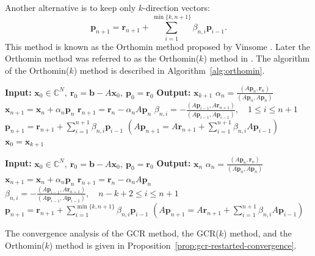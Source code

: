 {Another alternative is to keep only $k$-direction vectors:}
\[\bm p_{n+1}=\bm r_{n+1}+\sum_{i=1}^{\min\{k,n+1\}}\beta_{n,i}\bm p_{i-1}.\]
{This method is known as the Orthomin method proposed by Vinsome . Later the Orthomin method was referred to as the Orthomin($k$) method in . The algorithm of the Orthomin($k$) method is described in Algorithm\ \ref{alg:orthomin}.}
\begin{algorithm}[H]\caption{{The GCR($k$) method}}\label{alg:gcr-restarted}\begin{algorithmic}[1]
\Statex\textbf{Input:} $\bm x_0\in\mathbb C^N,\ \bm r_0=\bm b-A\bm x_0,\ \bm p_0=\bm r_0$
\Statex\textbf{Output:} $\bm x_{k+1}$
\State $\alpha_n=\frac{(A\bm p_n,\bm r_n)}{(A\bm p_n,A\bm p_n)}$
\State $\bm x_{n+1}=\bm x_n+\alpha_n\bm p_n$
\State $\bm r_{n+1}=\bm r_n-\alpha_nA\bm p_n$
\State $\beta_{n,i}=-\frac{(A\bm p_{i-1},A\bm r_{n+1})}{(A\bm p_{i-1},A\bm p_{i-1})},\quad1\le i\le n+1$
\State $\bm p_{n+1}=\bm r_{n+1}+\sum_{i=1}^{n+1}\beta_{n,i}\bm p_{i-1}$
\State $(A\bm p_{n+1}=A\bm r_{n+1}+\sum_{i=1}^{n+1}\beta_{n,i}A\bm p_{i-1})$
\EndFor\State $\bm x_0=\bm x_{k+1}$
\end{algorithmic}\end{algorithm}
\begin{algorithm}[H]\caption{{The Orthomin($k$) method}}\label{alg:orthomin}\begin{algorithmic}[1]
\Statex\textbf{Input:} $\bm x_0\in\mathbb C^N,\ \bm r_0=\bm b-A\bm x_0,\ \bm p_0=\bm r_0$
\Statex\textbf{Output:} $\bm x_n$
\State $\alpha_n=\frac{(A\bm p_n,\bm r_n)}{(A\bm p_n,A\bm p_n)}$
\State $\bm x_{n+1}=\bm x_n+\alpha_n\bm p_n$
\State $\bm r_{n+1}=\bm r_n-\alpha_nA\bm p_n$
\State $\beta_{n,i}=-\frac{(A\bm p_{i-1},A\bm r_{n+1})}{(A\bm p_{i-1},A\bm p_{i-1})},\quad n-k+2\le i\le n+1$
\State $\bm p_{n+1}=\bm r_{n+1}+\sum_{i=1}^{\min\{k,n+1\}}\beta_{n,i}\bm p_{i-1}$
\State $(A\bm p_{n+1}=A\bm r_{n+1}+\sum_{i=1}^{n+1}\beta_{n,i}A\bm p_{i-1})$
\EndFor\end{algorithmic}\end{algorithm}
{The convergence analysis of the GCR method, the GCR($k$) method, and the Orthomin($k$) method is given in Proposition\ \ref{prop:gcr-restarted-convergence}.}
\par{}
